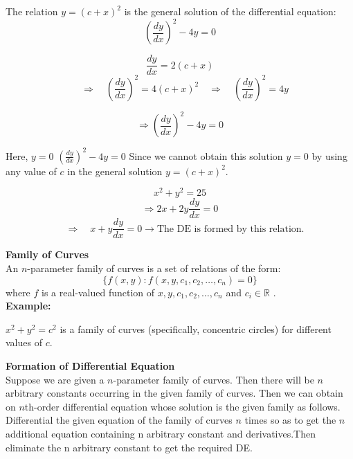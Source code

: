 \documentclass[a4aper,12pt]{report}
\begin{document}
\begin{tcolorbox}[breakable, title = {\textbf{Example 1.5: Find the singular and general solution of the D.E. \(
\left( \dfrac{dy}{dx} \right)^2 - 4y = 0
\) }}]
    The relation \( y = (c + x)^2 \) is the general solution of the differential equation:
\[
\left( \frac{dy}{dx} \right)^2 - 4y = 0
\]

\[
\frac{dy}{dx} = 2(c + x)\]
\[
\quad \Rightarrow \quad \left( \frac{dy}{dx} \right)^2 = 4(c + x)^2
\quad \Rightarrow \quad \left( \frac{dy}{dx} \right)^2 = 4y
\]

\[
\Rightarrow \left( \frac{dy}{dx} \right)^2 - 4y = 0
\]

Here, \( y = 0 \)   $\left( \frac{dy}{dx} \right)^2 - 4y = 0$
Since we cannot obtain this solution \( y = 0 \) by using any value of \( c \) in the general solution \( y = (c + x)^2 \).
\end{tcolorbox}
\begin{tcolorbox}[breakable, title = {\textbf{Example 1.6: Find a D.E. from its singular solution.} }]
  \[
x^2 + y^2 = 25
\]
\[
\Rightarrow 2x + 2y \frac{dy}{dx} = 0
\]
\[
\quad \Rightarrow \boxed{\quad x + y \frac{dy}{dx} = 0 } \longrightarrow \text{The DE is formed by this relation.}
\]  
\end{tcolorbox}
\vspace{1em}



\vspace{1em}
\newpage
\noindent\textbf{ Family of Curves} \\ [5pt]
An \( n \)-parameter family of curves is a set of relations of the form:
\[
\{f(x,y) : f(x, y, c_1, c_2, \ldots, c_n) = 0\}
\]
 where \( f \) is a real-valued function of  \(x, y, c_1, c_2, \ldots, c_n\) and \( c_i \in \mathbb{R} \)
 .
\vspace{1em}
\\ {\textbf{Example:}}
\par $x^2 + y^2 = c^2$ is a family of curves (specifically, concentric circles) for different values of \( c \). 
\begin{center}
\end{center}
\noindent \textbf{Formation of Differential Equation} \\ [5pt]
Suppose we are given a \( n \)-parameter family of curves. Then there will be \( n \) arbitrary constants occurring in the given family of curves. Then we can obtain on \( n \)th-order differential equation whose solution is the given family as follows. \\ [5pt]
Differential the given equation of the family of curves \( n \) times so as to get the \( n \) additional equation containing n arbitrary constant and derivatives.Then eliminate the n arbitrary constant to get the required DE.
\end{document}

